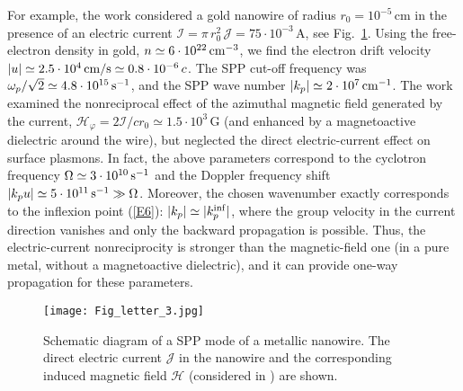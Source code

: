 \documentclass[9pt,twocolumn,twoside]{osajnl}
\begin{document}
For example, the work \cite{DE2014} considered a gold nanowire of radius $r_0=10^{-5}\,$cm in the presence of an electric current ${\mathcal I} = \pi\, r_0^2\,{\mathcal J} = 75 \cdot {10^{ - 3}}\,$A, see Fig.~\ref{F3}. Using the free-electron density in gold, $n \simeq 6 \cdot {10^{22}}\,{\rm cm}^{-3}$, we find the electron drift velocity $\left| u \right| \simeq 2.5 \cdot {10^4}\,{\rm cm}/{\rm s} \simeq 0.8 \cdot {10^{ - 6}}\, c$. The SPP cut-off frequency was ${\omega _p}/\sqrt 2  \simeq 4.8 \cdot {10^{15}}\, {\rm s}^{-1}$, and the SPP wave number $\left| {{k_p}} \right| \simeq 2 \cdot {10^7}\,{\rm cm}^{-1}$. The work \cite{DE2014} examined the nonreciprocal effect of the azimuthal magnetic field generated by the current, ${{\mathcal H}_{\varphi }} = 2{\mathcal I}/c{r_0} \simeq 1.5 \cdot {10^3}\,$G (and enhanced by a magnetoactive dielectric around the wire), but neglected the direct electric-current effect on surface plasmons. In fact, the above parameters correspond to the cyclotron frequency $\Omega  \simeq 3 \cdot {10^{10}}\, {\rm s}^{-1}$ and the Doppler frequency shift $\left| {{k_p}u} \right| \simeq 5 \cdot {10^{11}}\, {\rm s}^{ - 1} \gg \Omega$.   Moreover, the chosen wavenumber exactly corresponds to the inflexion point (\ref{E6}): $| k_p | \simeq |k_p^{\rm inf}|$, where the group velocity in the current direction vanishes and only the backward propagation is possible. Thus, the electric-current nonreciprocity is stronger than the magnetic-field one (in a pure metal, without a magnetoactive dielectric), and it can provide one-way propagation for these parameters.

\begin{figure}[t]
\centering
\texttt{[image: Fig\_letter\_3.jpg]}
\caption{Schematic diagram of a SPP mode of a metallic nanowire. The direct electric current ${\bm{\mathcal J}}$ in the nanowire and the corresponding induced magnetic field ${\bm{\mathcal H}}$ (considered in \cite{DE2014}) are shown.}
\label{F3}
\end{figure}
\end{document}
